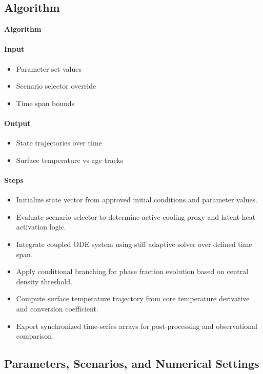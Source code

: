 \documentclass[11pt]{article}
\begin{document}
\subsection{Algorithm}

\noindent\textbf{Algorithm}
\paragraph{Input}
\begin{itemize}\raggedright
\item Parameter set values
\item Scenario selector override
\item Time span bounds
\end{itemize}
\paragraph{Output}
\begin{itemize}\raggedright
\item State trajectories over time
\item Surface temperature vs age tracks
\end{itemize}
\paragraph{Steps}
\begin{itemize}\raggedright
\item Initialize state vector from approved initial conditions and parameter values.
\item Evaluate scenario selector to determine active cooling proxy and latent-heat activation logic.
\item Integrate coupled ODE system using stiff adaptive solver over defined time span.
\item Apply conditional branching for phase fraction evolution based on central density threshold.
\item Compute surface temperature trajectory from core temperature derivative and conversion coefficient.
\item Export synchronized time-series arrays for post-processing and observational comparison.
\end{itemize}

\subsection{Parameters, Scenarios, and Numerical Settings}
\end{document}
